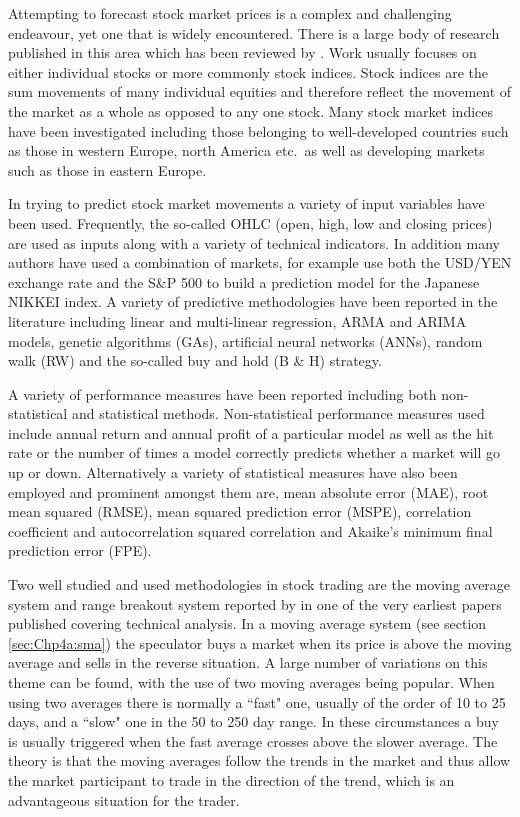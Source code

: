 Attempting to forecast stock market prices is a complex and challenging endeavour, yet one that is widely encountered. There is a large body of research published in this area which has been reviewed by \cite{Atsalakis20095932}. Work usually focuses on either individual stocks or more commonly stock indices. Stock indices are the sum movements of many individual equities and therefore reflect the movement of the market as a whole as opposed to any one stock. Many stock market indices have been investigated including those belonging to well-developed countries such as those in western Europe, north America etc.\ as well as developing markets such as those in eastern Europe.

In trying to predict stock market movements a variety of input variables have been used. Frequently, the so-called OHLC (open, high, low and closing prices) are used as inputs along with a variety of technical indicators. In addition many authors have used a combination of markets, for example \cite{Huang20052513} use both the USD/YEN exchange rate and the S\&P 500 to build a prediction model for the Japanese NIKKEI index. A variety of predictive methodologies have been reported in the literature including linear and multi-linear regression, ARMA and ARIMA models, genetic algorithms (GAs), artificial neural networks (ANNs), random walk (RW) and the so-called buy and hold (B \& H) strategy.

A variety of performance measures have been reported including both non-statistical and statistical methods. Non-statistical performance measures used include annual return and annual profit of a particular model as well as the hit rate or the number of times a model correctly predicts whether a market will go up or down. Alternatively a variety of statistical measures have also been employed and prominent amongst them are, mean absolute error (MAE), root mean squared (RMSE), mean squared prediction error (MSPE), correlation coefficient and autocorrelation squared correlation and Akaike’s minimum final prediction error (FPE).

Two well studied and used methodologies in stock trading are the moving average system and range breakout system reported by \citep{Brock} in one of the very earliest papers published covering technical analysis. In a moving average system (see section \ref{sec:Chp4a:sma}) the speculator buys a market when its price is above the moving average and sells in the reverse situation. A large number of variations on this theme can be found, with the use of two moving averages being popular. When using two averages there is normally a \textquotedblleft fast" one, usually of the order of 10 to 25 days,  and a \textquotedblleft slow" one in the 50 to 250 day range. In these circumstances a buy is usually triggered when the fast average crosses above the slower average. The theory is that the moving averages follow the trends in the market and thus allow the market participant to trade in the direction of the trend, which is an advantageous situation for the trader.

